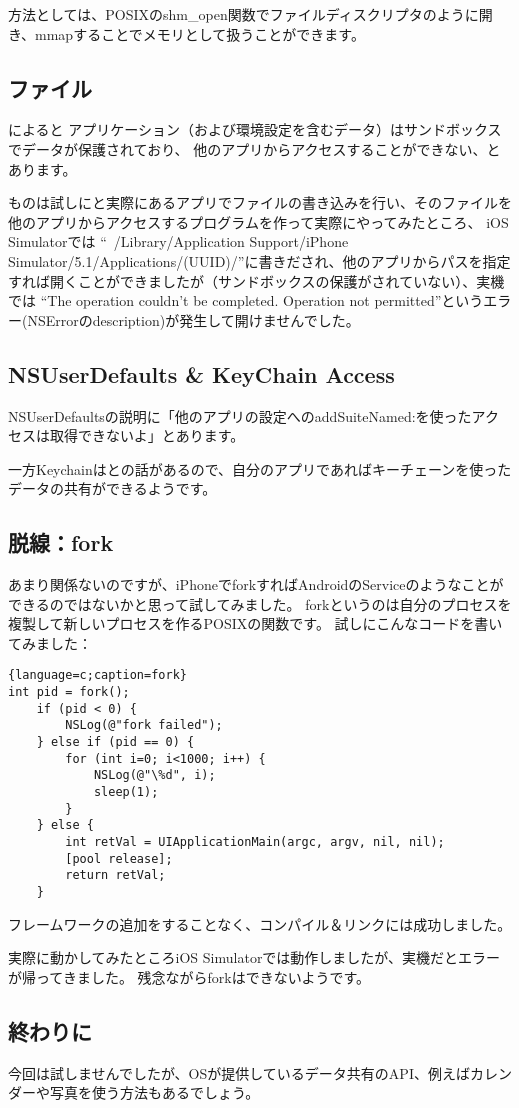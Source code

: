 方法としては、POSIXのshm\_open関数でファイルディスクリプタのように開き、mmapすることでメモリとして扱うことができます。

\subsection{ファイル}
によると
アプリケーション（および環境設定を含むデータ）はサンドボックスでデータが保護されており、
他のアプリからアクセスすることができない、とあります。

ものは試しにと実際にあるアプリでファイルの書き込みを行い、そのファイルを他のアプリからアクセスするプログラムを作って実際にやってみたところ、
iOS Simulatorでは
``~/Library/Application Support/iPhone Simulator/5.1/Applications/(UUID)/''に書きだされ、他のアプリからパスを指定すれば開くことができましたが（サンドボックスの保護がされていない）、実機では
``The operation couldn't be completed. Operation not permitted''というエラー(NSErrorのdescription)が発生して開けませんでした。

\subsection{NSUserDefaults \& KeyChain Access}
NSUserDefaultsの説明に「他のアプリの設定へのaddSuiteNamed:を使ったアクセスは取得できないよ」とあります。

一方Keychainはとの話があるので、自分のアプリであればキーチェーンを使ったデータの共有ができるようです。

\subsection{脱線：fork}
あまり関係ないのですが、iPhoneでforkすればAndroidのServiceのようなことができるのではないかと思って試してみました。
forkというのは自分のプロセスを複製して新しいプロセスを作るPOSIXの関数です。
試しにこんなコードを書いてみました：
\begin{lstlisting}{language=c;caption=fork}
int pid = fork();
	if (pid < 0) {
		NSLog(@"fork failed");
	} else if (pid == 0) {
		for (int i=0; i<1000; i++) {
			NSLog(@"\%d", i);
			sleep(1);
		}
	} else {
		int retVal = UIApplicationMain(argc, argv, nil, nil);
		[pool release];
		return retVal;
	}
\end{lstlisting}
フレームワークの追加をすることなく、コンパイル＆リンクには成功しました。

実際に動かしてみたところiOS Simulatorでは動作しましたが、実機だとエラーが帰ってきました。
残念ながらforkはできないようです。

\subsection{終わりに}
今回は試しませんでしたが、OSが提供しているデータ共有のAPI、例えばカレンダーや写真を使う方法もあるでしょう。

